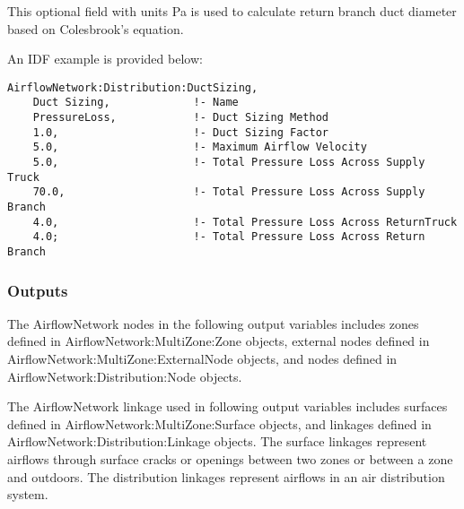 This optional field with units Pa is used to calculate return branch duct diameter based on Colesbrook's equation. 

An IDF example is provided below:

\begin{lstlisting}
AirflowNetwork:Distribution:DuctSizing,
    Duct Sizing,             !- Name
    PressureLoss,            !- Duct Sizing Method
    1.0,                     !- Duct Sizing Factor
    5.0,                     !- Maximum Airflow Velocity
    5.0,                     !- Total Pressure Loss Across Supply Truck
    70.0,                    !- Total Pressure Loss Across Supply Branch
    4.0,                     !- Total Pressure Loss Across ReturnTruck
    4.0;                     !- Total Pressure Loss Across Return Branch
\end{lstlisting}


\subsubsection{Outputs}\label{outputs-002}

The AirflowNetwork nodes in the following output variables includes zones defined in AirflowNetwork:MultiZone:Zone objects, external nodes defined in AirflowNetwork:MultiZone:ExternalNode objects, and nodes defined in AirflowNetwork:Distribution:Node objects.

The AirflowNetwork linkage used in following output variables includes surfaces defined in AirflowNetwork:MultiZone:Surface objects, and linkages defined in AirflowNetwork:Distribution:Linkage objects. The surface linkages represent airflows through surface cracks or openings between two zones or between a zone and outdoors. The distribution linkages represent airflows in an air distribution system.


